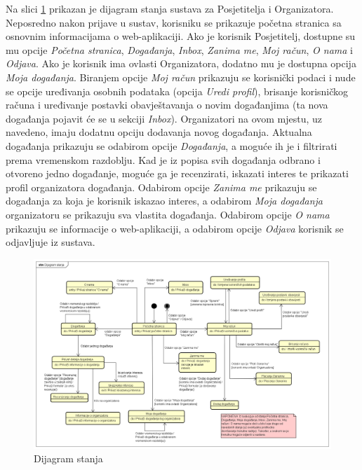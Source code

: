 			 Na slici \ref{sd} prikazan je dijagram stanja sustava za Posjetitelja i Organizatora. Neposredno nakon prijave u sustav, korisniku se prikazuje početna stranica sa osnovnim informacijama o web-aplikaciji. Ako je korisnik Posjetitelj, dostupne su mu opcije \textit{Početna stranica}, \textit{Događanja}, \textit{Inbox}, \textit{Zanima me}, \textit{Moj račun}, \textit{O nama} i \textit{Odjava}. Ako je korisnik ima ovlasti Organizatora, dodatno mu je dostupna opcija \textit{Moja događanja}. Biranjem opcije \textit{Moj račun} prikazuju se korisnički podaci i nude se opcije uređivanja osobnih podataka (opcija \textit{Uredi profil}), brisanje korisničkog računa i uređivanje postavki obavještavanja o novim događanjima (ta nova događanja pojavit će se u sekciji \textit{Inbox}). Organizatori na ovom mjestu, uz navedeno, imaju dodatnu opciju dodavanja novog događanja. Aktualna događanja prikazuju se odabirom opcije \textit{Događanja}, a moguće ih je i filtrirati prema vremenskom razdoblju.  Kad je iz popisa svih događanja odbrano i otvoreno jedno događanje, moguće ga je recenzirati, iskazati interes te prikazati profil organizatora događanja. Odabirom opcije \textit{Zanima me} prikazuju se događanja za koja je korisnik iskazao interes, a odabirom \textit{Moja događanja} organizatoru se prikazuju sva vlastita događanja. Odabirom opcije \textit{O nama} prikazuju se informacije o web-aplikaciji, a odabirom opcije \textit{Odjava} korisnik se odjavljuje iz sustava. 
				
			
			 \begin{figure}[H]
				\includegraphics[width=\textwidth]{dijagrami/sd.png} 
				\centering
				\vspace{-0.75cm}
				\caption{Dijagram stanja}
				\label{sd}
			\end{figure}
			
